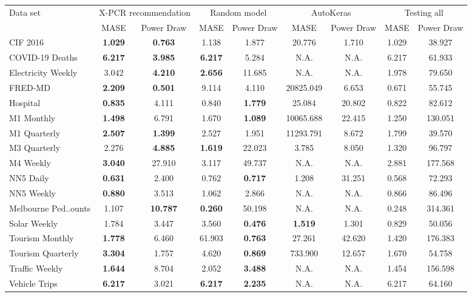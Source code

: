 
    \begin{tabular}{l|cc|cc|cc||cc}
        \toprule 
        Data set & \multicolumn{2}{c}{X-PCR recommendation} & \multicolumn{2}{c}{Random model} & \multicolumn{2}{c}{AutoKeras} & \multicolumn{2}{c}{Testing all} \\
          & MASE & Power Draw & MASE & Power Draw & MASE & Power Draw & MASE & Power Draw \\
        \midrule
        CIF 2016 & \textbf{1.029} & \textbf{0.763} & 1.138 & 1.877 & 20.776 & 1.710 & 1.029 & 38.927 \\
        COVID-19 Deaths & \textbf{6.217} & \textbf{3.985} & \textbf{6.217} & 5.284 & N.A. & N.A. & 6.217 & 61.933 \\
        Electricity Weekly & 3.042 & \textbf{4.210} & \textbf{2.656} & 11.685 & N.A. & N.A. & 1.978 & 79.650 \\
        FRED-MD & \textbf{2.209} & \textbf{0.501} & 9.114 & 4.110 & 20825.049 & 6.653 & 0.671 & 55.745 \\
        Hospital & \textbf{0.835} & 4.111 & 0.840 & \textbf{1.779} & 25.084 & 20.802 & 0.822 & 82.612 \\
        M1 Monthly & \textbf{1.498} & 6.791 & 1.670 & \textbf{1.089} & 10065.688 & 22.415 & 1.250 & 130.051 \\
        M1 Quarterly & \textbf{2.507} & \textbf{1.399} & 2.527 & 1.951 & 11293.791 & 8.672 & 1.799 & 39.570 \\
        M3 Quarterly & 2.276 & \textbf{4.885} & \textbf{1.619} & 22.023 & 3.785 & 8.050 & 1.320 & 96.797 \\
        M4 Weekly & \textbf{3.040} & 27.910 & 3.117 & 49.737 & N.A. & N.A. & 2.881 & 177.568 \\
        NN5 Daily & \textbf{0.631} & 2.400 & 0.762 & \textbf{0.717} & 1.208 & 31.251 & 0.568 & 72.293 \\
        NN5 Weekly & \textbf{0.880} & 3.513 & 1.062 & 2.866 & N.A. & N.A. & 0.866 & 86.496 \\
        Melbourne Ped..ounts & 1.107 & \textbf{10.787} & \textbf{0.260} & 50.198 & N.A. & N.A. & 0.248 & 314.361 \\
        Solar Weekly & 1.784 & 3.447 & 3.560 & \textbf{0.476} & \textbf{1.519} & 1.301 & 0.829 & 50.056 \\
        Tourism Monthly & \textbf{1.778} & 6.460 & 61.903 & \textbf{0.763} & 27.261 & 42.620 & 1.420 & 176.383 \\
        Tourism Quarterly & \textbf{3.304} & 1.757 & 4.620 & \textbf{0.869} & 733.900 & 12.657 & 1.670 & 54.758 \\
        Traffic Weekly & \textbf{1.644} & 8.704 & 2.052 & \textbf{3.488} & N.A. & N.A. & 1.454 & 156.598 \\
        Vehicle Trips & \textbf{6.217} & 3.021 & \textbf{6.217} & \textbf{2.235} & N.A. & N.A. & 6.217 & 64.160 \\
        \bottomrule
    \end{tabular}